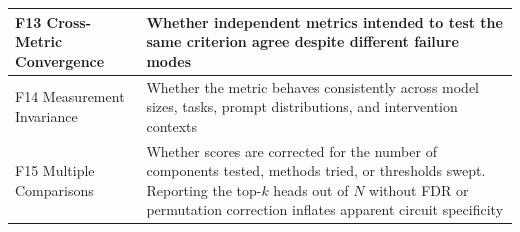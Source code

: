\documentclass{article}
\begin{document}
\begin{minipage}{\linewidth}
\begin{center}
\begin{tabular}{@{}lp{10cm}@{}}
\midrule
F13 Cross-Metric Convergence & Whether independent metrics intended to test the same criterion agree despite different failure modes \\
\midrule
F14 Measurement Invariance & Whether the metric behaves consistently across model sizes, tasks, prompt distributions, and intervention contexts \\
\midrule
F15 Multiple Comparisons & Whether scores are corrected for the number of components tested, methods tried, or thresholds swept. Reporting the top-$k$ heads out of $N$ without FDR or permutation correction inflates apparent circuit specificity \\
\bottomrule
\end{tabular}
\end{center}
\end{minipage}

\endgroup
\end{document}
